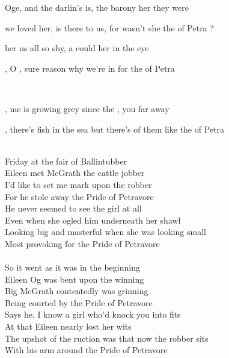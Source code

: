 \begin{SBVerse*}
 Oge, and  the darlin's  is,  the barony her  they were 

 we loved her,  is there to  us, for wasn't she the  of Petra ?

 her   us all so shy,  a  could  her in the eye

, O , sure  reason why we're in  for the  of Petra
\end{SBVerse*}
~\\
\begin{SBChorus}
 , me  is growing grey  since the , you  far away

 , there's  fish in the sea but there's  of them like the  of Petra
\end{SBChorus}
~\\
Friday at the fair of Ballintubber \\
Eileen met McGrath the cattle jobber\\
I'd like to set me mark upon the robber \\
For he stole away the Pride of Petravore\\
He never seemed to see the girl at all \\
Even when she ogled him underneath her shawl \\
Looking big and masterful when she was looking small\\
Most provoking for the Pride of Petravore \\
~\\
So it went as it was in the beginning \\
Eileen Og was bent upon the winning \\
Big McGrath contentedly was grinning\\
Being courted by the Pride of Petravore\\
Says he, \og I know a girl who'd knock you into fits \fg \\
At that Eileen nearly lost her wits \\
The upshot of the ruction was that now the robber sits \\
With his arm around the Pride of Petravore \\
